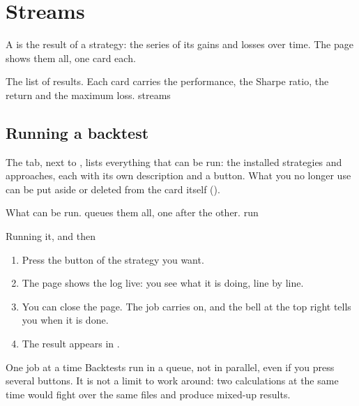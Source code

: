 \chapter{Streams}\label{cap:streams}

A  is the result of a strategy: the series of its gains and
losses over time. The  page shows them all, one card each.

  {The list of results. Each card carries the performance, the Sharpe ratio,
   the return and the maximum loss.}
  {streams}

\section{Running a backtest}\label{sez:run}

The  tab, next to , lists everything that
can be run: the installed strategies and approaches, each with its own
description and a button. What you no longer use can be put aside or deleted
from the card itself ().

  {What can be run.  queues them all, one after the
   other.}
  {run}

\begin{pratica}{Running it, and then}
\begin{enumerate}
  \item Press the button of the strategy you want.
  \item The page shows the log live: you see what it is doing, line by line.
  \item You can close the page. The job carries on, and the bell at the top
        right tells you when it is done.
  \item The result appears in .
\end{enumerate}
\end{pratica}

\begin{attenzione}{One job at a time}
Backtests run in a queue, not in parallel, even if you press several
buttons. It is not a limit to work around: two calculations at the same time
would fight over the same files and produce mixed-up results.
\end{attenzione}

